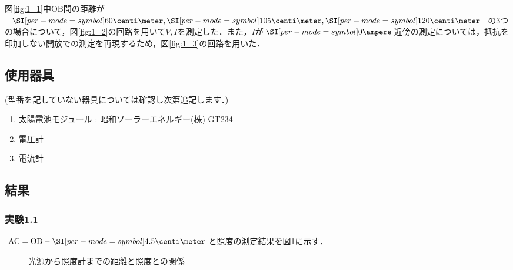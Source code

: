 \documentclass[1_power_supply.tex]{subfiles}
\begin{document}
図\ref{fig:1_1}中OB間の距離が$\SIs{60}{\centi\meter},\SIs{105}{\centi\meter},\SIs{120}{\centi\meter}$の3つの場合について，図\ref{fig:1_2}の回路を用いて$V,I$を測定した．また，$I$が$\SIs{0}{\ampere}$近傍の測定については，抵抗を印加しない開放での測定を再現するため，図\ref{fig:1_3}の回路を用いた．

\subsection{使用器具}
(型番を記していない器具については確認し次第追記します．)
\begin{enumerate}
	\item 太陽電池モジュール : 昭和ソーラーエネルギー(株) GT234
	\item 電圧計
	\item 電流計
\end{enumerate}

\subsection{結果}

\subsubsection{実験1.1}

$\mathrm{AC}=\mathrm{OB}-\SIs{4.5}{\centi\meter}$と照度の測定結果を図\ref{fig:1_dE}に示す．

\begin{figure}[htbp]
	\begin{center}
		\caption{光源から照度計までの距離と照度との関係}\label{fig:1_dE}
	\end{center}
\end{figure}
\end{document}
